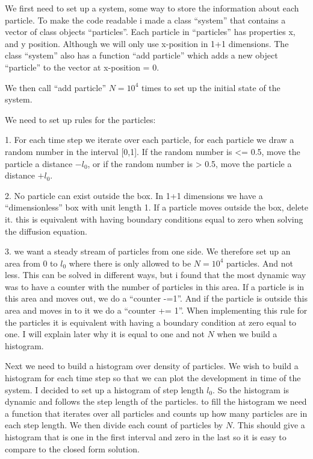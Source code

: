 \documentclass[english,a4paper,12pt]{article}
\begin{document}
We first need to set up a system, some way to store the information about each particle. To make the code readable i made a class ``system''
that contains a vector of class objects ``particles''. Each particle in ``particles'' has properties x, and y position. Although we will only
use x-position in 1+1 dimensions. The class ``system'' also has a function ``add particle'' which adds a new object ``particle'' to the vector at x-position = 0.

We then call ``add particle'' $N=10^4$ times to set up the initial state of the system.

We need to set up rules for the particles:

1. For each time step we iterate over each particle, for each particle we draw a random number in the interval [0,1].
If the random number is <= 0.5, move the particle a distance $-l_0$, or if the random number is > 0.5, move the particle a distance $+l_0$.

2. No particle can exist outside the box. In 1+1 dimensions we have a ``dimensionless'' box with unit length 1. If a particle moves outside the box, 
delete it.
this is equivalent with having boundary conditions equal to zero when solving the diffusion equation.

3. we want a steady stream of particles from one side. We therefore set up an area from 0 to $l_0$ where there is only allowed to be
$N=10^4$ particles. And not less. This can be solved in different ways, but i found that the most dynamic way was to have a counter with
the number of particles in this area. If a particle is in this area and moves out, we do a ``counter -=1''. And if the particle is outside this
area and moves in to it we do a ``counter += 1''.
When implementing this rule for the particles it is equivalent with having a boundary condition at zero equal to one.
I will explain later why it is equal to one and not $N$ when we build a histogram.

Next we need to build a histogram over density of particles. We wish to build a histogram for each time step so that we can plot the development
in time of the system. I decided to set up a histogram of step length $l_0$. So the histogram is dynamic and follows the step length of the particles.
to fill the histogram we need a function that iterates over all particles and counts up how many particles are in each step length. We then divide each count of particles
by $N$. This should give a histogram that is one in the first interval and zero in the last so it is easy to compare to the closed form
solution.
\end{document}

